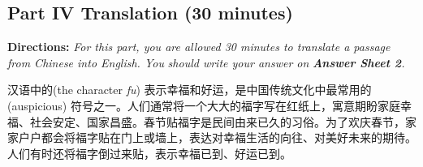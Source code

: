 \documentclass[UTF8,11pt]{ctexart}
\begin{document}
\subsection*{\textbf{Part IV Translation (30 minutes)}}


\textbf{Directions: }\textit{For this part, you are allowed 30 minutes to translate a passage from Chinese into English. You} \textit{should write your answer on }\textbf{\textit{Answer Sheet 2}}\textit{.}


汉语中的(the character \textit{fu}) 表示幸福和好运，是中国传统文化中最常用的(auspicious) 符号之一。人们通常将一个大大的福字写在红纸上，寓意期盼家庭幸福、社会安定、国家昌盛。春节贴福字是民间由来已久的习俗。为了欢庆春节，家家户户都会将福字贴在门上或墙上，表达对幸福生活的向往、对美好未来的期待。人们有时还将福字倒过来贴，表示幸福已到、好运已到。
\end{document}
